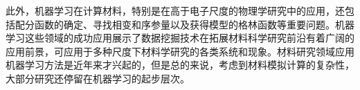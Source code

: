 \documentclass[10pt, oneside, a4paper]{article}      %
\newcommand{\upcite}[1]{\hspace{0ex}\textsuperscript{\cite{#1}}} %
\begin{document}
此外，机器学习在计算材料，特别是在高于电子尺度的物理学研究中的应用，还包括配分函数的确定\upcite{JCP149-044118_2018}、寻找相变和序参量\upcite{PRB94-195105_2016,NP13-431_2017,PRB96-205146_2017,SR7-8823_2017,PRB97-115453_2018}以及获得模型的格林函数\upcite{PRB90-155136_2014}等重要问题。机器学习这些领域的成功应用展示了数据挖掘技术在拓展材料科学研究前沿有着广阔的应用前景，可应用于多种尺度下材料学研究的各类系统和现象。材料研究领域应用机器学习方法是近年来才兴起的，但是总的来说，考虑到材料模拟计算的复杂性，大部分研究还停留在机器学习的起步层次\upcite{Nature559-547_2018,NPJCM3-54_2017,COSSMS21-167_2016,JM3-519_2017,JMR31-977_2016,MRSB41-399_2016,Science361-360_2018,JCP148-241401_2018,MRSB43-683_2018}。%


\end{document}
